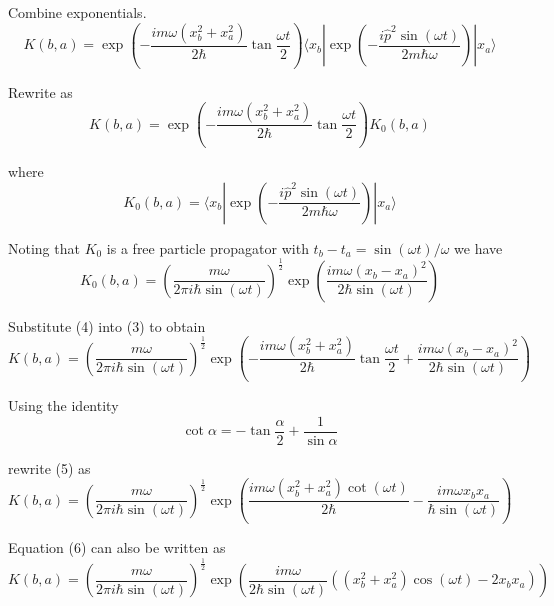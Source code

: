 Combine exponentials.
\begin{equation*}
K(b,a)=\exp\left(-\frac{im\omega(x_b^2+x_a^2)}{2\hbar}\tan\frac{\omega t}{2}\right)
\langle x_b|
\exp\left(-\frac{i\hat p^2\sin(\omega t)}{2m\hbar\omega}\right)
|x_a\rangle
\end{equation*}

Rewrite as
\begin{equation*}
K(b,a)=\exp\left(-\frac{im\omega(x_b^2+x_a^2)}{2\hbar}\tan\frac{\omega t}{2}\right)K_0(b,a)
\tag{3}
\end{equation*}

where
\begin{equation*}
K_0(b,a)=\langle x_b|\exp\left(-\frac{i\hat p^2\sin(\omega t)}{2m\hbar\omega}\right)|x_a\rangle
\end{equation*}

Noting that $K_0$ is a free particle propagator with $t_b-t_a=\sin(\omega t)/\omega$ we have
\begin{equation*}
K_0(b,a)=\left(\frac{m\omega}{2\pi i\hbar\sin(\omega t)}\right)^\frac{1}{2}
\exp\left(\frac{im\omega(x_b-x_a)^2}{2\hbar\sin(\omega t)}\right)
\tag{4}
\end{equation*}

Substitute (4) into (3) to obtain
\begin{equation*}
K(b,a)=\left(\frac{m\omega}{2\pi i\hbar\sin(\omega t)}\right)^\frac{1}{2}
\exp\left(-\frac{im\omega(x_b^2+x_a^2)}{2\hbar}\tan\frac{\omega t}{2}
+\frac{im\omega(x_b-x_a)^2}{2\hbar\sin(\omega t)}\right)
\tag{5}
\end{equation*}

Using the identity
\begin{equation*}
\cot\alpha=-\tan\frac{\alpha}{2}+\frac{1}{\sin\alpha}
\end{equation*}

rewrite (5) as
\begin{equation*}
K(b,a)=\left(\frac{m\omega}{2\pi i\hbar\sin(\omega t)}\right)^\frac{1}{2}
\exp\left(\frac{im\omega(x_b^2+x_a^2)\cot(\omega t)}{2\hbar}
-\frac{im\omega x_bx_a}{\hbar\sin(\omega t)}\right)
\tag{6}
\end{equation*}

Equation (6) can also be written as
\begin{equation*}
K(b,a)=\left(\frac{m\omega}{2\pi i\hbar\sin(\omega t)}\right)^\frac{1}{2}
\exp\left(\frac{im\omega}{2\hbar\sin(\omega t)}\left((x_b^2+x_a^2)\cos(\omega t)-2x_bx_a\right)\right)
\end{equation*}


